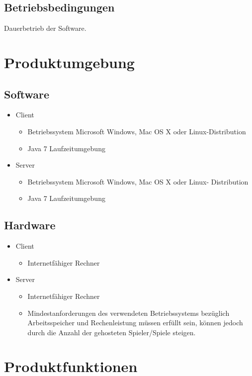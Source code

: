 \documentclass{article}
\begin{document}
\subsection{Betriebsbedingungen}
Dauerbetrieb der Software.

\section{Produktumgebung}
\subsection{Software}
	\begin{itemize}
		\item \gls{Client}
		\begin{itemize}
			\item Betriebssystem Microsoft Windows, Mac OS X oder Linux-Distribution 
			\item Java 7 Laufzeitumgebung
		\end{itemize}
		\item \gls{Server}
		\begin{itemize}
			\item Betriebssystem Microsoft Windows, Mac OS X oder Linux- Distribution 
			\item Java 7 Laufzeitumgebung
		\end{itemize}
	\end{itemize}

\subsection{Hardware}
\begin{itemize}
		\item \gls{Client}
		\begin{itemize}
			\item Internetfähiger Rechner
		\end{itemize}
		\item Server
		\begin{itemize}
			\item Internetfähiger Rechner	
			\item Mindestanforderungen des verwendeten Betriebssystems bezüglich Arbeitsspeicher und Rechenleistung 					      müssen erfüllt sein, können jedoch durch die Anzahl der gehosteten Spieler/Spiele steigen.
		\end{itemize}
	\end{itemize}

\section{Produktfunktionen}
\end{document}
